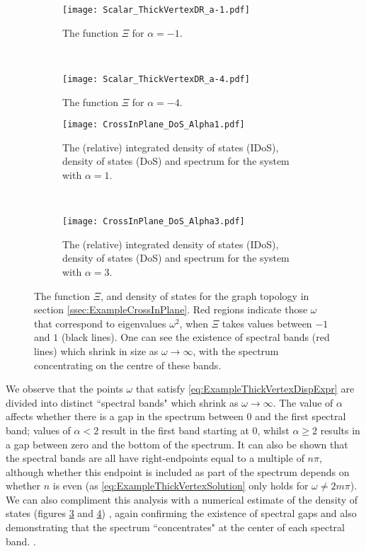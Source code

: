 \begin{figure}[t!]
	\centering
	\begin{subfigure}[t]{0.45\textwidth}
		\centering
		\texttt{[image: Scalar\_ThickVertexDR\_a-1.pdf]}
		\caption{\label{fig:Scalar_ThickVertexDR_a-1} The function $\Xi$ for $\alpha=-1$.}
	\end{subfigure}
	~
	\begin{subfigure}[t]{0.45\textwidth}
		\centering
		\texttt{[image: Scalar\_ThickVertexDR\_a-4.pdf]}
		\caption{\label{fig:Scalar_ThickVertexDR_a-4} The function $\Xi$ for $\alpha=-4$.}
	\end{subfigure}
	\newline
	\begin{subfigure}[t]{0.45\textwidth}
		\centering
		\texttt{[image: CrossInPlane\_DoS\_Alpha1.pdf]}
		\caption{\label{fig:CrossInPlane_DoS_Alpha1} The (relative) integrated density of states (IDoS), density of states (DoS) and spectrum for the system with $\alpha=1$.}
	\end{subfigure}
	~
	\begin{subfigure}[t]{0.45\textwidth}
		\centering
		\texttt{[image: CrossInPlane\_DoS\_Alpha3.pdf]}
		\caption{\label{fig:CrossInPlane_DoS_Alpha3} The (relative) integrated density of states (IDoS), density of states (DoS) and spectrum for the system with $\alpha=3$.}
	\end{subfigure}	
	\caption{\label{fig:Scalar_ThickVertexAllResults} The function $\Xi$, and density of states for the graph topology in section \ref{ssec:ExampleCrossInPlane}.
	Red regions indicate those $\omega$ that correspond to eigenvalues $\omega^2$, when $\Xi$ takes values between $-1$ and $1$ (black lines).
	One can see the existence of spectral bands (red lines) which shrink in size as $\omega\rightarrow\infty$, with the spectrum concentrating on the centre of these bands.}
\end{figure}
We observe that the points $\omega$ that satisfy \eqref{eq:ExampleThickVertexDispExpr} are divided into distinct ``spectral bands" which shrink as $\omega\rightarrow\infty$.
The value of $\alpha$ affects whether there is a gap in the spectrum between 0 and the first spectral band; values of $\alpha<2$ result in the first band starting at 0, whilst $\alpha\geq 2$ results in a gap between zero and the bottom of the spectrum.
It can also be shown that the spectral bands are all have right-endpoints equal to a multiple of $n\pi$, although whether this endpoint is included as part of the spectrum depends on whether $n$ is even (as \eqref{eq:ExampleThickVertexSolution} only holds for $\omega\neq 2m\pi$).
We can also compliment this analysis with a numerical estimate of the density of states (figures \ref{fig:CrossInPlane_DoS_Alpha1} and \ref{fig:CrossInPlane_DoS_Alpha3}) , again confirming the existence of spectral gaps and also demonstrating that the spectrum ``concentrates" at the center of each spectral band.
.